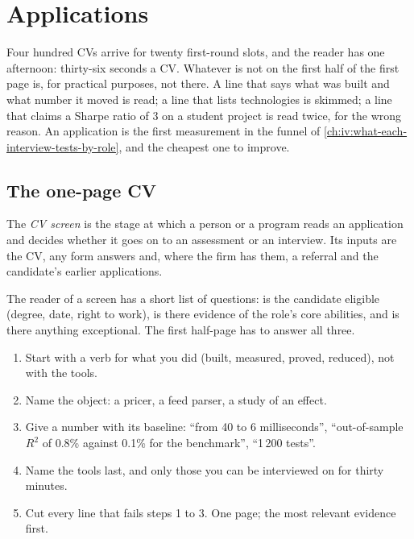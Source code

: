 \chapter{Applications}\label{ch:iv:applications}

Four hundred CVs arrive for twenty first-round slots, and the reader has one afternoon: thirty-six seconds a
CV. Whatever is not on the first half of the first page is, for practical purposes, not there. A line that
says what was built and what number it moved is read; a line that lists technologies is skimmed; a line that
claims a Sharpe ratio of 3 on a student project is read twice, for the wrong reason. An application is the
first measurement in the funnel of \cref{ch:iv:what-each-interview-tests-by-role}, and the cheapest one to
improve.

\section{The one-page CV}

\begin{definition}[CV screen]\label{def:iv:applications:screen}
The \emph{CV screen} is the stage at which a person or a program reads an application and
decides whether it goes on to an assessment or an interview. Its inputs are the CV, any form answers and,
where the firm has them, a referral and the candidate's earlier applications.
\end{definition}

The reader of a screen has a short list of questions: is the candidate eligible (degree, date, right to
work), is there evidence of the role's core abilities, and is there anything exceptional. The first half-page
has to answer all three.

\begin{method}\label{met:iv:applications:line}
\begin{enumerate}
\item Start with a verb for what you did (built, measured, proved, reduced), not with the tools.
\item Name the object: a pricer, a feed parser, a study of an effect.
\item Give a number with its baseline: ``from 40 to 6 milliseconds'', ``out-of-sample $R^2$ of 0.8\% against
0.1\% for the benchmark'', ``1\,200 tests''.
\item Name the tools last, and only those you can be interviewed on for thirty minutes.
\item Cut every line that fails steps 1 to 3. One page; the most relevant evidence first.
\end{enumerate}
\end{method}

